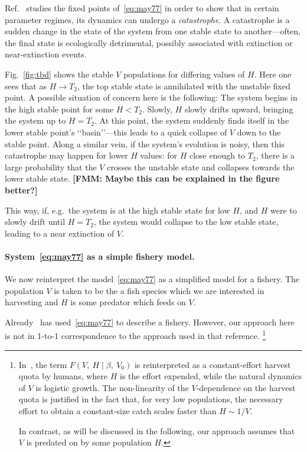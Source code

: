 \documentclass[smallextended]{svjour3}       %
\def\div{\;|\;}
\newcommand{\fm}[1]{{\color{Fabulous}\bf [FMM: #1]}}
\begin{document}
Ref.~\cite{may77} studies the fixed points of~\eqref{eq:may77} in order to show that in certain parameter regimes, its dynamics can undergo a \emph{catastrophe}.
A catastrophe is a sudden change in the state of the system from one stable state to another---often, the final state is ecologically detrimental, possibly associated with extinction or near-extinction events.

Fig.~\ref{fig:tbd} shows the stable $V$ populations for differing values of $H$. 
Here one sees that as $H\to T_2$, the top stable state is annihilated with the unstable fixed point.
A possible situation of concern here is the following:
The system begins in the high stable point for some $H<T_2$.
Slowly, $H$ slowly drifts upward, bringing the system up to $H=T_2$.
At this point, the system suddenly finds itself in the lower stable point's ‘‘basin’’---this leads to a quick collapse of $V$ down to the stable point.
Along a similar vein, if the system's evolution is noisy, then this catastrophe may happen for lower $H$ values: for $H$ close enough to $T_2$, there is a large probability that the $V$ crosses the unstable state and collapses towards the lower stable state.
\fm{Maybe this can be explained in the figure better?}

This way, if, e.g.\ the system is at the high stable state for low $H$, and $H$ were to slowly drift until $H=T_2$, the system would collapse to the low stable state, leading to a near extinction of $V$.

\hypertarget{paragraph-headings}{%
\paragraph{System~\eqref{eq:may77} as a simple fishery model.}\label{p:may as fishery}}
We now reinterpret the model~\eqref{eq:may77} as a simplified model for a fishery.
The population $V$ is taken to be the a fish species which we are interested in harvesting and $H$ is some predator which feeds on $V$.

 Already~\cite{may77} has used~\eqref{eq:may77} to describe a fishery.
 However, our approach here is not in 1-to-1 correspondence to the approach used in that reference.
\footnote{
  In~\cite{may77}, the term $F(V,\ H\div \beta,\ V_0)$ is reinterpreted as a constant-effort harvest quota by humans, where $H$ is the effort expended, while the natural dynamics of $V$ is logistic growth.
  The non-linearity of the $V$-dependence on the harvest quota is justified in the fact that, for very low populations, the necessary effort to obtain a constant-size catch scales faster than $H\sim 1/V$.
  
  In contrast, as will be discussed in the following, our approach assumes that $V$ is predated on by some population $H$.
}
\end{document}
